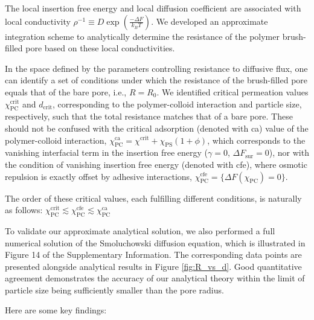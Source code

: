 \documentclass[12pt, a4paper]{article}
\begin{document}
The local insertion free energy and local diffusion coefficient are associated with local conductivity $\rho^{-1}\equiv D \exp\left(\frac{-\Delta F}{k_B T}\right)$.
We developed an approximate integration scheme to analytically determine the resistance of the polymer brush-filled pore based on these local conductivities.

In the space defined by the parameters controlling resistance to diffusive flux, one can identify a set of conditions under which the resistance of the brush-filled pore equals that of the bare pore, i.e., $R = R_{0}$.
We identified critical permeation values $\chi^{\text{crit}}_{\text{PC}}$ and $d_{\text{crit}}$, corresponding to the polymer-colloid interaction and particle size, respectively, such that the total resistance matches that of a bare pore.
These should not be confused with the critical adsorption (denoted with ca) value of the polymer-colloid interaction, $\chi^{\text{ca}}_{\text{PC}} = \chi^{\text{crit}} + \chi_{\text{PS}}(1 + \phi)$, which corresponds to the vanishing interfacial term in the insertion free energy ($\gamma = 0$, $\Delta F_{\text{sur}} = 0$), nor with the condition of vanishing insertion free energy (denoted with cfe), where osmotic repulsion is exactly offset by adhesive interactions, $\chi^{\text{cfe}}_{\text{PC}} = \{\Delta F (\chi_{\text{PC}}) = 0\}$.

The order of these critical values, each fulfilling different conditions, is naturally as follows:
$\chi^{\text{crit}}_{\text{PC}} \lesssim \chi^{\text{cfe}}_{\text{PC}} \lesssim \chi^{\text{ca}}_{\text{PC}}$
 
To validate our approximate analytical solution, we also performed a full numerical solution of the Smoluchowski diffusion equation, which is illustrated in 
Figure 14 of the Supplementary Information.
The corresponding data points are presented alongside analytical results in Figure \ref{fig:R_vs_d}.
Good quantitative agreement demonstrates the accuracy of our analytical theory within the limit of particle size being sufficiently smaller than the pore radius.

Here are some key findings:
\end{document}
